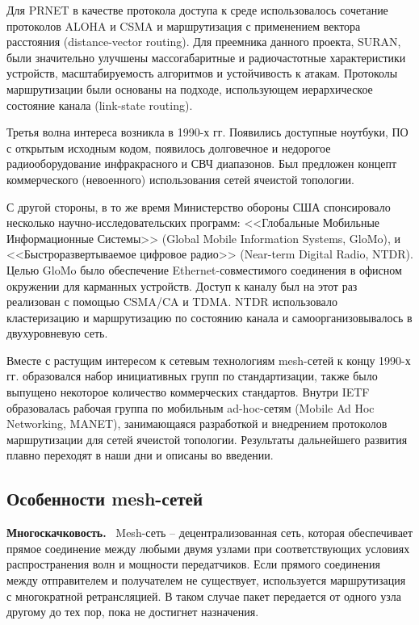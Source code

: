 \documentclass[14pt,a4paper,titlepage]{extarticle}
\renewcommand{\paragraph}[1]{\textbf{#1.}~}
\begin{document}
Для PRNET в качестве протокола доступа к среде использовалось сочетание протоколов ALOHA и CSMA и маршрутизация с применением вектора расстояния (distance-vector routing). Для преемника данного проекта, SURAN, были значительно улучшены массогабаритные и радиочастотные характеристики устройств, масштабируемость алгоритмов и устойчивость к атакам. Протоколы маршрутизации были основаны на подходе, использующем иерархическое состояние канала (link-state routing).

Третья волна интереса возникла в 1990-х гг. Появились доступные ноутбуки, ПО с открытым исходным кодом, появилось долговечное и недорогое радиооборудование инфракрасного и СВЧ диапазонов. Был предложен концепт коммерческого (невоенного) использования сетей ячеистой топологии. 

С другой стороны, в то же время Министерство обороны США спонсировало несколько научно-исследовательских программ: <<Глобальные Мобильные Информационные Системы>> (Global Mobile Information Systems, GloMo), и <<Быстроразвертываемое цифровое радио>> (Near-term Digital Radio, NTDR). Целью GloMo было обеспечение Ethernet-совместимого соединения в офисном окружении для карманных устройств. Доступ к каналу был на этот раз реализован с помощью CSMA/CA и TDMA. NTDR использовало кластеризацию и маршрутизацию по состоянию канала и самоорганизовывалось в двухуровневую сеть.

Вместе с растущим интересом к сетевым технологиям mesh-сетей  к концу 1990-х гг. образовался набор инициативных групп по стандартизации, также было выпущено некоторое количество коммерческих стандартов. Внутри IETF образовалась рабочая группа по мобильным ad-hoc-сетям (Mobile Ad Hoc Networking, MANET), занимающаяся разработкой и внедрением протоколов маршрутизации для сетей ячеистой топологии. Результаты дальнейшего развития плавно переходят в наши дни и описаны во введении.

\subsection{Особенности mesh-сетей}

\paragraph{Многоскачковость}
Mesh-сеть -- децентрализованная сеть, которая обеспечивает прямое соединение между любыми двумя узлами при соответствующих условиях распространения волн и мощности передатчиков. Если прямого соединения между отправителем и получателем не существует, используется маршрутизация с многократной ретрансляцией. В таком случае пакет передается от одного узла другому до тех пор, пока не достигнет назначения. 
\end{document}
